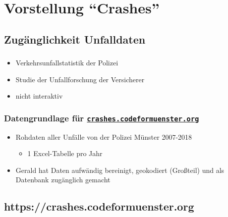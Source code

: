 \documentclass{beamer}
\begin{document}
\section{Vorstellung "`Crashes"'}

\subsection{Zugänglichkeit Unfalldaten}

\begin{frame}
  \frametitle{\subsecname}
  
  \begin{itemize}
    \item Verkehrsunfallstatistik der Polizei \cite{Polizei2019}
    \pause
    \item Studie der Unfallforschung der Versicherer \cite{Baier2018}
    \pause
    \item nicht interaktiv
  \end{itemize}
\end{frame}

\begin{frame}
  \frametitle{Datengrundlage für \href{https://crashes.codeformuenster.org}{\texttt{crashes.codeformuenster.org}}}
  
  \begin{itemize}
    \item Rohdaten aller Unfälle von der Polizei Münster 2007-2018
    \begin{itemize}
      \item 1 Excel-Tabelle pro Jahr
    \end{itemize}
    \pause
    \item Gerald hat Daten aufwändig bereinigt, geokodiert (Großteil) und als Datenbank zugänglich gemacht
  \end{itemize}  
\end{frame}

\subsection{https://crashes.codeformuenster.org}
\end{document}
